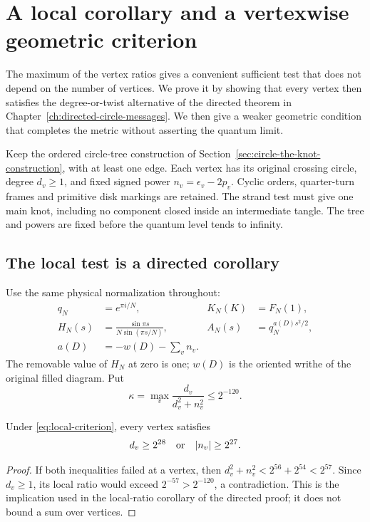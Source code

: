 \chapter{A local corollary and a vertexwise geometric criterion}
\label{ch:local-circle-messages}

The maximum of the vertex ratios gives a convenient sufficient test
that does not depend on the number of vertices. We prove it by showing
that every vertex then satisfies the degree-or-twist alternative of
the directed theorem in Chapter~\ref{ch:directed-circle-messages}.
We then give a weaker geometric condition that completes the metric
without asserting the quantum limit.

Keep the ordered circle-tree construction of
Section~\ref{sec:circle-the-knot-construction}, with at least one edge.
Each vertex has its original crossing circle, degree \(d_v\ge1\),
and fixed signed power \(n_v=\epsilon_v-2p_v\). Cyclic orders,
quarter-turn frames and primitive disk markings are retained. The
strand test must give one main knot, including no component
closed inside an intermediate tangle. The tree and powers are fixed
before the quantum level tends to infinity.

\section{The local test is a directed corollary}

Use the same physical normalization throughout:
\begin{equation}\label{eq:local-normalizations}
\begin{aligned}
 q_N&=e^{\pi i/N},& K_N(K)&=F_N(1),\\
 H_N(s)&=\frac{\sin\pi s}{N\sin(\pi s/N)},&
 A_N(s)&=q_N^{a(D)s^2/2},\\
 a(D)&=-w(D)-\sum_v n_v.
\end{aligned}
\end{equation}
The removable value of \(H_N\) at zero is one; \(w(D)\) is the
oriented writhe of the original filled diagram. Put
\begin{equation}\label{eq:local-criterion}
 \kappa=\max_v\frac{d_v}{d_v^2+n_v^2}\le2^{-120}.
\end{equation}

\begin{lemma}
\label{lem:local-implies-directed}
Under \eqref{eq:local-criterion}, every vertex satisfies
\[
                 d_v\ge2^{28}\quad\hbox{or}\quad |n_v|\ge2^{27}.
\]
\end{lemma}
\begin{proof}
If both inequalities failed at a vertex, then
\(d_v^2+n_v^2<2^{56}+2^{54}<2^{57}\). Since \(d_v\ge1\),
its local ratio would exceed \(2^{-57}>2^{-120}\), a contradiction.
This is the implication used in the local-ratio corollary of the
directed proof; it does not bound a sum over vertices.
\end{proof}

